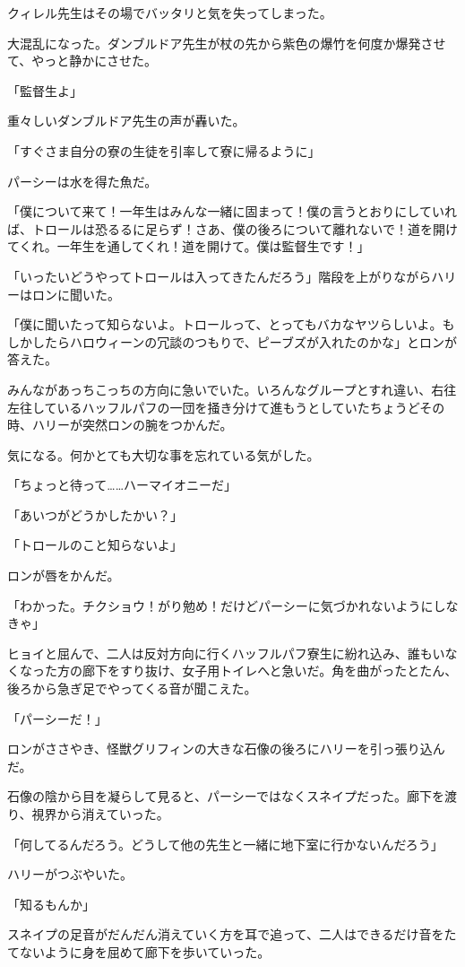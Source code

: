 \documentclass[10pt,a4paper]{article}
\begin{document}
\begin{CJK}{UTF8}{min}
クィレル先生はその場でバッタリと気を失ってしまった。

大混乱になった。ダンブルドア先生が杖の先から紫色の爆竹を何度か爆発させて、やっと静かにさせた。

「監督生よ」

重々しいダンブルドア先生の声が轟いた。

「すぐさま自分の寮の生徒を引率して寮に帰るように」

パーシーは水を得た魚だ。

「僕について来て！一年生はみんな一緒に固まって！僕の言うとおりにしていれば、トロールは恐るるに足らず！さあ、僕の後ろについて離れないで！道を開けてくれ。一年生を通してくれ！道を開けて。僕は監督生です！」

「いったいどうやってトロールは入ってきたんだろう」階段を上がりながらハリーはロンに聞いた。

「僕に聞いたって知らないよ。トロールって、とってもバカなヤツらしいよ。もしかしたらハロウィーンの冗談のつもりで、ピーブズが入れたのかな」とロンが答えた。

みんながあっちこっちの方向に急いでいた。いろんなグループとすれ違い、右往左往しているハッフルパフの一団を掻き分けて進もうとしていたちょうどその時、ハリーが突然ロンの腕をつかんだ。

気になる。何かとても大切な事を忘れている気がした。

「ちょっと待って……ハーマイオニーだ」

「あいつがどうかしたかい？」

「トロールのこと知らないよ」

ロンが唇をかんだ。

「わかった。チクショウ！がり勉め！だけどパーシーに気づかれないようにしなきゃ」

ヒョイと屈んで、二人は反対方向に行くハッフルパフ寮生に紛れ込み、誰もいなくなった方の廊下をすり抜け、女子用トイレへと急いだ。角を曲がったとたん、後ろから急ぎ足でやってくる音が聞こえた。

「パーシーだ！」

ロンがささやき、怪獣グリフィンの大きな石像の後ろにハリーを引っ張り込んだ。

石像の陰から目を凝らして見ると、パーシーではなくスネイプだった。廊下を渡り、視界から消えていった。

「何してるんだろう。どうして他の先生と一緒に地下室に行かないんだろう」

ハリーがつぶやいた。

「知るもんか」

スネイプの足音がだんだん消えていく方を耳で追って、二人はできるだけ音をたてないように身を屈めて廊下を歩いていった。


\end{CJK}
\end{document}
